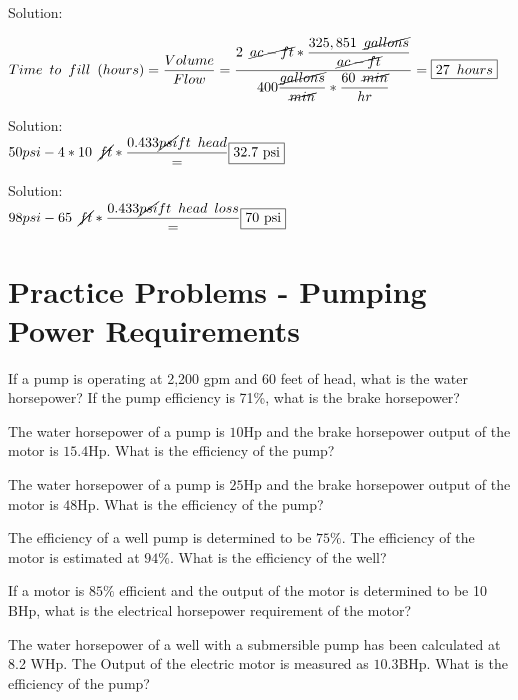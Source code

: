  \vspace{0.2cm}

 Solution:\\
 
 \vspace{0.2cm}
 
 $Time \enspace to \enspace fill \enspace(hours)= \dfrac{Volume}{Flow}=\dfrac{2 \enspace \cancel{ac-ft}*\dfrac{325,851 \enspace \cancel{gallons}}{\cancel{ac-ft}}}{400 \dfrac{\cancel{gallons}}{\cancel{min}}*\dfrac{60 \enspace\cancel{ min}}{hr}}=\boxed{27 \enspace hours}$
 

 Solution:\\ 
 \vspace{0.2cm}
$
50 psi - 4*10 \enspace \cancel{ft}*\dfrac{0.433\cancel{psi}{ft \enspace head}}=\boxed{32.7 \text { psi}}
$


 Solution:\\ 
 \vspace{0.2cm}
$
98 psi - 65 \enspace \cancel{ft}*\dfrac{0.433\cancel{psi}{ft \enspace head \enspace loss}}=\boxed{70 \text { psi}}
$





\section*{Practice Problems - Pumping Power Requirements}

  If a pump is operating at 2,200 gpm and 60 feet of head, what is the water
horsepower? If the pump efficiency is 71\%, what is the brake horsepower?

The water horsepower of a pump is $10 \mathrm{Hp}$ and the brake horsepower output of the motor is $15.4 \mathrm{Hp}$. What is the efficiency of the pump?

The water horsepower of a pump is $25 \mathrm{Hp}$ and the brake horsepower output of the motor is $48 \mathrm{Hp}$. What is the efficiency of the pump?

The efficiency of a well pump is determined to be $75 \%$. The efficiency of the motor is estimated at $94 \%$. What is the efficiency of the well?

If a motor is $85 \%$ efficient and the output of the motor is determined to be 10
$\mathrm{BHp}$, what is the electrical horsepower requirement of the motor?

The water horsepower of a well with a submersible pump has been calculated at 8.2 WHp. The Output of the electric motor is measured as $10.3 \mathrm{BHp}$. What is the efficiency of the pump?

